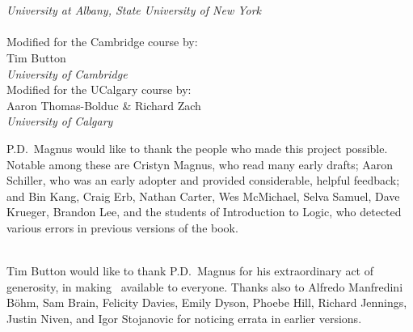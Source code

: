 \thispagestyle{empty}
\noindent {\HUGE\forallx}

\


\vfill


\\
\emph{University at Albany, State University of New York}\\
\\
{Modified for the Cambridge course by:\\ Tim Button}\\
\emph{University of Cambridge}
\\
{Modified for the UCalgary course by:\\ Aaron Thomas-Bolduc \& Richard Zach}\\
\emph{University of Calgary}



\newpage
\thispagestyle{empty}%
\noindent P.D.\ Magnus would like to thank the people who made this project possible. Notable among these are Cristyn Magnus, who read many early drafts; Aaron Schiller, who was an early adopter and provided considerable, helpful feedback; {and} Bin Kang, Craig Erb, Nathan Carter, Wes McMichael, Selva Samuel,  Dave Krueger, Brandon Lee, and the students of Introduction to Logic, who detected various errors in previous versions of the book.

\
\\
Tim Button would like to thank P.D.\ Magnus for his extraordinary act of generosity, in making \forallx\ available to everyone. Thanks also to Alfredo Manfredini B\"{o}hm, Sam Brain, Felicity Davies, Emily Dyson, Phoebe Hill, Richard Jennings, Justin Niven,  and Igor Stojanovic for noticing errata in earlier versions.

